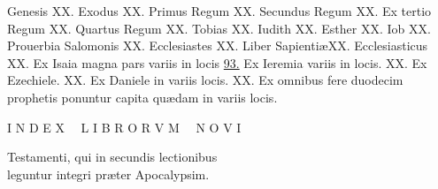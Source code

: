 \documentclass[a5paper,10pt]{book}
\def\ae{æ}
\begin{document}
\begin{multicols}{2}
\par \noindent Genesis \hfill XX.
\newline Exodus \hfill XX.
\newline Primus Regum \hfill XX.
\newline Secundus Regum \hfill XX.
\newline Ex tertio Regum \hfill XX.
\newline Quartus Regum \hfill XX.
\newline Tobias \hfill XX.
\newline Iudith \hfill XX.
\newline Esther \hfill XX.
\newline Iob \hfill XX.
\newline Prouerbia Salomonis \hfill XX.
\newline Ecclesiastes \hfill XX.
\newline Liber Sapienti\ae \hfill XX.
\newline Ecclesiasticus \hfill XX.
\newline Ex Isaia magna pars variis in
\newline \indent locis \hfill \hyperlink{page.93}{93.}
\newline Ex Ieremia variis in locis. \hfill XX.
\newline Ex Ezechiele. \hfill XX.
\newline Ex Daniele in variis locis. \hfill XX.
\newline Ex omnibus fere duodecim
\newline \indent prophetis ponuntur capita
\newline \indent qu\ae dam in variis locis. %
\end{multicols}
\vspace{+1em}

\begin{center} \color{red} \Large
I N D E X \ \ L I B R O R V M \ \ N O V I
\end{center}
\vspace{-1.5em}

\begin{center} \large
Testamenti, qui in secundis lectionibus\\
leguntur integri pr\ae ter Apocalypsim.
\end{center}
\end{document}

